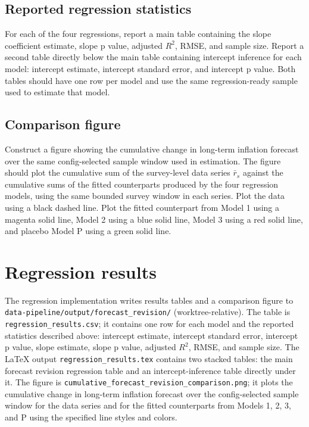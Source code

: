 \documentclass[11pt]{article}
\begin{document}
\subsection{Reported regression statistics}

For each of the four regressions, report a main table containing the slope
coefficient estimate, slope p value, adjusted $R^2$, RMSE, and sample size.
Report a second table directly below the main table containing intercept
inference for each model: intercept estimate, intercept standard error, and
intercept p value. Both tables should have one row per model and use the same
regression-ready sample used to estimate that model.

\subsection{Comparison figure}

Construct a figure showing the cumulative change in long-term inflation
forecast over the same config-selected sample window used in estimation. The
figure should plot the cumulative sum of the survey-level data series
$\bar{r}_s$ against the cumulative sums of the fitted counterparts produced by
the four regression models, using the same bounded survey window in each
series. Plot the data using a black dashed line.
Plot the fitted counterpart from Model 1 using a magenta solid line, Model 2
using a blue solid line, Model 3 using a red solid line, and placebo Model P
using a green solid line.

\section{Regression results}

The regression implementation writes results tables and a comparison figure to
\texttt{data-pipeline/output/forecast\_revision/} (worktree-relative). The table is
\texttt{regression\_results.csv}; it contains one row for each model and the
reported statistics described above: intercept estimate, intercept standard
error, intercept p value, slope estimate, slope p value, adjusted $R^2$, RMSE,
and sample size. The LaTeX output
\texttt{regression\_results.tex} contains two stacked tables: the main
forecast revision regression table and an intercept-inference table directly
under it. The figure is
\texttt{cumulative\_forecast\_revision\_comparison.png}; it plots the cumulative
change in long-term inflation forecast over the config-selected sample window
for the data series and
for the fitted counterparts from Models 1, 2, 3, and P using the specified line
styles and colors.
\end{document}
